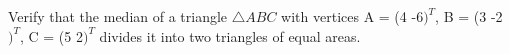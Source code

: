 
Verify that the median of a triangle $\triangle ABC $
with vertices A = (4  -6$)^{T}$, B = (3  -2$)^{T}$, C = (5  2$)^{T}$ divides it into two triangles of equal areas.



